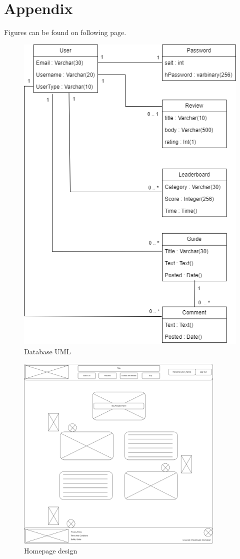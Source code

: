 \documentclass{article}
\begin{document}
\section{Appendix}
Figures can be found on following page.
\begin{figure}[!b]
    \centering
    \includegraphics[scale=0.5]{figs/databaseUML.png}
    \caption{Database UML}
    \label{fig:1}
\end{figure}

\begin{figure}[!b]
    \centering
    \includegraphics[width=10cm]{figs/homepage.png}
    \caption{Homepage design}
    \label{fig:2}
\end{figure}


\end{document}
